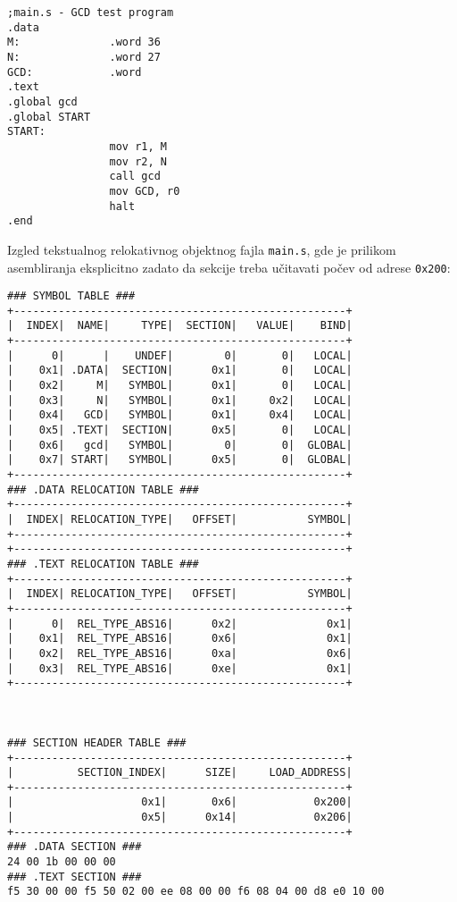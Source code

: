 \begin{lstlisting}
;main.s - GCD test program
.data
M:              .word 36
N:              .word 27
GCD:            .word
.text
.global gcd
.global START
START:
                mov r1, M
                mov r2, N
                call gcd
                mov GCD, r0
                halt
.end
\end{lstlisting}
Izgled tekstualnog relokativnog objektnog fajla \texttt{main.s}, gde je prilikom
ase\-mbliranja eksplicitno zadato da sekcije treba učitavati počev od adrese \texttt{0x200}:
\begin{lstlisting}
### SYMBOL TABLE ###
+----------------------------------------------------+
|  INDEX|  NAME|     TYPE|  SECTION|   VALUE|    BIND|
+----------------------------------------------------+
|      0|      |    UNDEF|        0|       0|   LOCAL|
|    0x1| .DATA|  SECTION|      0x1|       0|   LOCAL|
|    0x2|     M|   SYMBOL|      0x1|       0|   LOCAL|
|    0x3|     N|   SYMBOL|      0x1|     0x2|   LOCAL|
|    0x4|   GCD|   SYMBOL|      0x1|     0x4|   LOCAL|
|    0x5| .TEXT|  SECTION|      0x5|       0|   LOCAL|
|    0x6|   gcd|   SYMBOL|        0|       0|  GLOBAL|
|    0x7| START|   SYMBOL|      0x5|       0|  GLOBAL|
+----------------------------------------------------+
### .DATA RELOCATION TABLE ###
+----------------------------------------------------+
|  INDEX| RELOCATION_TYPE|   OFFSET|           SYMBOL|
+----------------------------------------------------+
+----------------------------------------------------+
### .TEXT RELOCATION TABLE ###
+----------------------------------------------------+
|  INDEX| RELOCATION_TYPE|   OFFSET|           SYMBOL|
+----------------------------------------------------+
|      0|  REL_TYPE_ABS16|      0x2|              0x1|
|    0x1|  REL_TYPE_ABS16|      0x6|              0x1|
|    0x2|  REL_TYPE_ABS16|      0xa|              0x6|
|    0x3|  REL_TYPE_ABS16|      0xe|              0x1|
+----------------------------------------------------+



### SECTION HEADER TABLE ###
+----------------------------------------------------+
|          SECTION_INDEX|      SIZE|     LOAD_ADDRESS|
+----------------------------------------------------+
|                    0x1|       0x6|            0x200|
|                    0x5|      0x14|            0x206|
+----------------------------------------------------+
### .DATA SECTION ###
24 00 1b 00 00 00 
### .TEXT SECTION ###
f5 30 00 00 f5 50 02 00 ee 08 00 00 f6 08 04 00 d8 e0 10 00 
\end{lstlisting}
